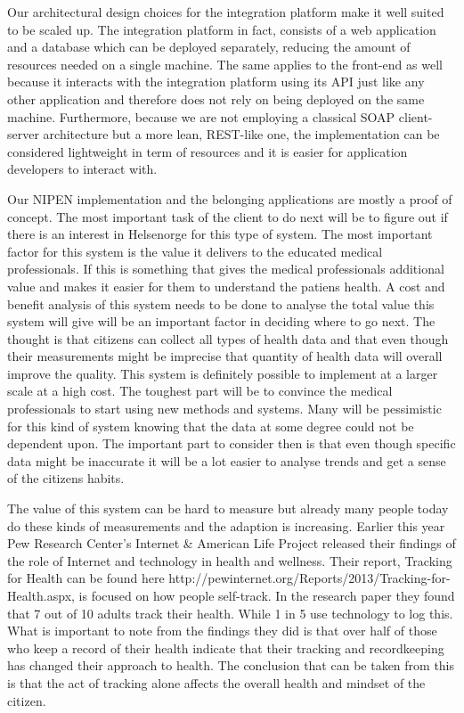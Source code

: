 Our architectural design choices for the integration platform make it well suited to be scaled up.
The integration platform in fact, consists of a web application and a database which can be deployed separately, reducing the amount of resources needed on a single machine.
The same applies to the front-end as well because it interacts with the integration platform using its API just like any other application and therefore does not rely on being deployed on the same machine.
Furthermore, because we are not employing a classical SOAP client-server architecture but a more lean, REST-like one, the implementation can be considered lightweight in term of resources and it is easier for application developers to interact with.


\iffalse
Our NIPEN implementation and the belonging applications are mostly a proof of concept. 
The most important task of the client to do next will be to figure out if there is an interest in Helsenorge for this type of system.
The most important factor for this system is the value it delivers to the educated medical professionals. 
If this is something that gives the medical professionals additional value and makes it easier for them to understand the patiens health. 
A cost and benefit analysis of this system needs to be done to analyse the total value this system will give will be an important factor in deciding where to go next.
The thought is that citizens can collect all types of health data and that even though their measurements might be imprecise that quantity of health data will overall improve the quality.
This system is definitely possible to implement at a larger scale at a high cost.
The toughest part will be to convince the medical professionals to start using new methods and systems. 
Many will be pessimistic for this kind of system knowing that the data at some degree could not be dependent upon.
The important part to consider then is that even though specific data might be inaccurate it will be a lot easier to analyse trends and get a sense of the citizens habits. 

The value of this system can be hard to measure but already many people today do these kinds of measurements and the adaption is increasing. 
Earlier this year Pew Research Center’s Internet \& American Life Project released their findings of the role of Internet and technology in health and wellness. 
Their report, Tracking for Health can be found here http://pewinternet.org/Reports/2013/Tracking-for-Health.aspx, is focused on how people self-track.
In the research paper they found that 7 out of 10 adults track their health.
While 1 in 5 use technology to log this. 
What is important to note from the findings they did is that over half of those who keep a record of their health indicate that their tracking and recordkeeping has changed their approach to health.
The conclusion that can be taken from this is that the act of tracking alone affects the overall health and mindset of the citizen. 

